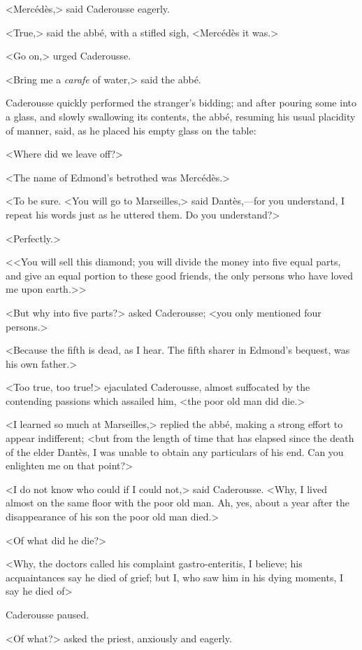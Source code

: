  <Mercédès,> said Caderousse eagerly. 

 <True,> said the abbé, with a stifled sigh, <Mercédès it was.> 

 <Go on,> urged Caderousse. 

 <Bring me a \textit{carafe} of water,> said the abbé. 

 Caderousse quickly performed the stranger's bidding; and after pouring some into a glass, and slowly swallowing its contents, the abbé, resuming his usual placidity of manner, said, as he placed his empty glass on the table: 

 <Where did we leave off?> 

 <The name of Edmond's betrothed was Mercédès.> 

 <To be sure. <You will go to Marseilles,> said Dantès,—for you understand, I repeat his words just as he uttered them. Do you understand?> 

 <Perfectly.> 

 <<You will sell this diamond; you will divide the money into five equal parts, and give an equal portion to these good friends, the only persons who have loved me upon earth.>> 

 <But why into five parts?> asked Caderousse; <you only mentioned four persons.> 

 <Because the fifth is dead, as I hear. The fifth sharer in Edmond's bequest, was his own father.> 

 <Too true, too true!> ejaculated Caderousse, almost suffocated by the contending passions which assailed him, <the poor old man did die.> 

 <I learned so much at Marseilles,> replied the abbé, making a strong effort to appear indifferent; <but from the length of time that has elapsed since the death of the elder Dantès, I was unable to obtain any particulars of his end. Can you enlighten me on that point?> 

 <I do not know who could if I could not,> said Caderousse. <Why, I lived almost on the same floor with the poor old man. Ah, yes, about a year after the disappearance of his son the poor old man died.> 

 <Of what did he die?> 

 <Why, the doctors called his complaint gastro-enteritis, I believe; his acquaintances say he died of grief; but I, who saw him in his dying moments, I say he died of\longdash> 

 Caderousse paused. 

 <Of what?> asked the priest, anxiously and eagerly. 

